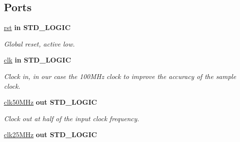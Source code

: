 \subsection*{Ports}
 \begin{DoxyCompactItemize}
\item 
\hypertarget{classclk__divide_aa7b7040844189161771c36cf6bbf172c}{\hyperlink{classclk__divide_aa7b7040844189161771c36cf6bbf172c}{rst}  {\bfseries {\bfseries \textcolor{vhdlkeyword}{in}\textcolor{vhdlchar}{ }}} {\bfseries \textcolor{comment}{S\-T\-D\-\_\-\-L\-O\-G\-I\-C}\textcolor{vhdlchar}{ }} }\label{classclk__divide_aa7b7040844189161771c36cf6bbf172c}

\begin{DoxyCompactList}\small\item\em Global reset, active low. \end{DoxyCompactList}\item 
\hypertarget{classclk__divide_a8120037e0ee47c35ba2d79242209c72e}{\hyperlink{classclk__divide_a8120037e0ee47c35ba2d79242209c72e}{clk}  {\bfseries {\bfseries \textcolor{vhdlkeyword}{in}\textcolor{vhdlchar}{ }}} {\bfseries \textcolor{comment}{S\-T\-D\-\_\-\-L\-O\-G\-I\-C}\textcolor{vhdlchar}{ }} }\label{classclk__divide_a8120037e0ee47c35ba2d79242209c72e}

\begin{DoxyCompactList}\small\item\em Clock in, in our case the 100\-M\-Hz clock to improve the accuracy of the sample clock. \end{DoxyCompactList}\item 
\hypertarget{classclk__divide_ab1f1a3ab1ab8a22adc572d22c78e6370}{\hyperlink{classclk__divide_ab1f1a3ab1ab8a22adc572d22c78e6370}{clk50\-M\-Hz}  {\bfseries {\bfseries \textcolor{vhdlkeyword}{out}\textcolor{vhdlchar}{ }}} {\bfseries \textcolor{comment}{S\-T\-D\-\_\-\-L\-O\-G\-I\-C}\textcolor{vhdlchar}{ }} }\label{classclk__divide_ab1f1a3ab1ab8a22adc572d22c78e6370}

\begin{DoxyCompactList}\small\item\em Clock out at half of the input clock frequency. \end{DoxyCompactList}\item 
\hypertarget{classclk__divide_af312c161ed7113c4b513d173c2d4d010}{\hyperlink{classclk__divide_af312c161ed7113c4b513d173c2d4d010}{clk25\-M\-Hz}  {\bfseries {\bfseries \textcolor{vhdlkeyword}{out}\textcolor{vhdlchar}{ }}} {\bfseries \textcolor{comment}{S\-T\-D\-\_\-\-L\-O\-G\-I\-C}\textcolor{vhdlchar}{ }} }\label{classclk__divide_af312c161ed7113c4b513d173c2d4d010}


\end{DoxyCompactItemize}
